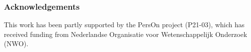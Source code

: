 \documentclass{svproc}
\begin{document}
\subsubsection*{Acknowledgements}
This work has been partly supported by the PersOn project
(P21-03), which has received funding from Nederlandse Organisatie voor Wetenschappelijk Onderzoek (NWO).



\end{document}
